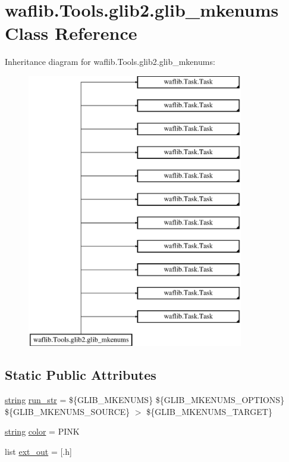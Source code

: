 \hypertarget{classwaflib_1_1_tools_1_1glib2_1_1glib__mkenums}{}\section{waflib.\+Tools.\+glib2.\+glib\+\_\+mkenums Class Reference}
\label{classwaflib_1_1_tools_1_1glib2_1_1glib__mkenums}
Inheritance diagram for waflib.\+Tools.\+glib2.\+glib\+\_\+mkenums\+:\begin{figure}[H]
\begin{center}
\leavevmode
\includegraphics[height=12.000000cm]{classwaflib_1_1_tools_1_1glib2_1_1glib__mkenums}
\end{center}
\end{figure}
\subsection*{Static Public Attributes}
\begin{DoxyCompactItemize}
\item 
\hyperlink{test__lib_f_l_a_c_2format_8c_ab02026ad0de9fb6c1b4233deb0a00c75}{string} \hyperlink{classwaflib_1_1_tools_1_1glib2_1_1glib__mkenums_a1fc98d38fffa786e04b95e6f1cd2e63a}{run\+\_\+str} = \textquotesingle{}\$\{G\+L\+I\+B\+\_\+\+M\+K\+E\+N\+U\+MS\} \$\{G\+L\+I\+B\+\_\+\+M\+K\+E\+N\+U\+M\+S\+\_\+\+O\+P\+T\+I\+O\+NS\} \$\{G\+L\+I\+B\+\_\+\+M\+K\+E\+N\+U\+M\+S\+\_\+\+S\+O\+U\+R\+CE\} $>$ \$\{G\+L\+I\+B\+\_\+\+M\+K\+E\+N\+U\+M\+S\+\_\+\+T\+A\+R\+G\+ET\}\textquotesingle{}
\item 
\hyperlink{test__lib_f_l_a_c_2format_8c_ab02026ad0de9fb6c1b4233deb0a00c75}{string} \hyperlink{classwaflib_1_1_tools_1_1glib2_1_1glib__mkenums_a78f97f7a6d8d04598d22f085ac01487e}{color} = \textquotesingle{}P\+I\+NK\textquotesingle{}
\item 
list \hyperlink{classwaflib_1_1_tools_1_1glib2_1_1glib__mkenums_ae8151e44c88ba599cf8bdadb7e14f74c}{ext\+\_\+out} = \mbox{[}\textquotesingle{}.h\textquotesingle{}\mbox{]}
\end{DoxyCompactItemize}

